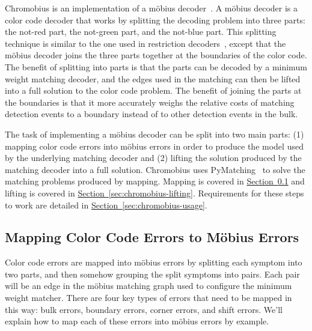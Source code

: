 \documentclass[onecolumn,unpublished,a4paper]{quantumarticle}
\theoremstyle{definition}
\theoremstyle{definition}
\theoremstyle{definition}
\renewcommand{\sec}[1]{\hyperref[sec:#1]{Section~\ref*{sec:#1}}}
\begin{document}
Chromobius is an implementation of a m{\"o}bius decoder~\cite{sahay2022mobiusdecoder}.
A m{\"o}bius decoder is a color code decoder that works by splitting the decoding problem into three parts: the not-red part, the not-green part, and the not-blue part.
This splitting technique is similar to the one used in restriction decoders~\cite{kubica2019restrictiondecoder}, except that the m{\"o}bius decoder joins the three parts together at the boundaries of the color code.
The benefit of splitting into parts is that the parts can be decoded by a minimum weight matching decoder, and the edges used in the matching can then be lifted into a full solution to the color code problem.
The benefit of joining the parts at the boundaries is that it more accurately weighs the relative costs of matching detection events to a boundary instead of to other detection events in the bulk.

The task of implementing a m{\"o}bius decoder can be split into two main parts: (1) mapping color code errors into m{\"o}bius errors in order to produce the model used by the underlying matching decoder and (2) lifting the solution produced by the matching decoder into a full solution.
Chromobius uses PyMatching~\cite{higgott2023sparseblossom} to solve the matching problems produced by mapping.
Mapping is covered in \sec{chromobius-error-mapping} and lifting is covered in \sec{chromobius-lifting}.
Requirements for these steps to work are detailed in \sec{chromobius-usage}.

\subsection{Mapping Color Code Errors to M{\"o}bius Errors}
\label{sec:chromobius-error-mapping}

Color code errors are mapped into m{\"o}bius errors by splitting each symptom into two parts, and then somehow grouping the split symptoms into pairs.
Each pair will be an edge in the m{\"o}bius matching graph used to configure the minimum weight matcher.
There are four key types of errors that need to be mapped in this way: bulk errors, boundary errors, corner errors, and shift errors.
We'll explain how to map each of these errors into m{\"o}bius errors by example.
\end{document}

